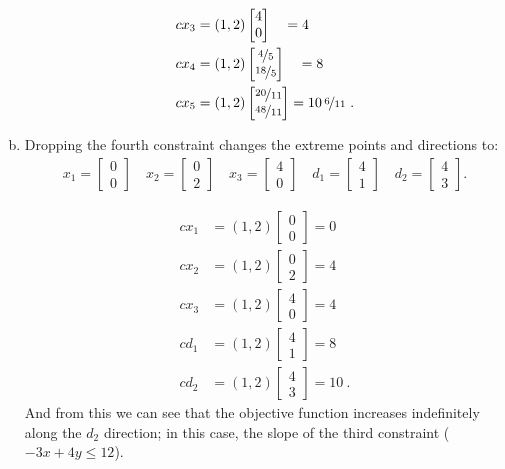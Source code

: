 \documentclass[12pt]{amsart}
\begin{document}
\begin{enumerate}[a.]
\begin{align*}
		cx_3 &= (1,2)\begin{bmatrix} 4 \\ 0 \end{bmatrix} \quad  = 4 \\
		cx_4 &= (1,2)\begin{bmatrix} \nicefrac{4}{5} \\ \nicefrac{18}{5} \end{bmatrix} \quad = 8 \\
		cx_5 &= (1,2)\begin{bmatrix}\nicefrac{20}{11}\\ \nicefrac{48}{11} \end{bmatrix} = 10 \,\nicefrac{6}{11} \ . 
	\end{align*}
	
	\item 
	Dropping the fourth constraint changes the extreme points and directions to:
	\begin{align*}
		x_1 = \begin{bmatrix} 0 \\ 0 \end{bmatrix} \quad
		x_2 = \begin{bmatrix} 0 \\ 2 \end{bmatrix} \quad
		x_3 = \begin{bmatrix} 4 \\ 0 \end{bmatrix} \quad
		d_1 = \begin{bmatrix} 4 \\ 1 \end{bmatrix} \quad
		d_2 = \begin{bmatrix} 4 \\ 3 \end{bmatrix}.
	\end{align*}

	\begin{align*}
		cx_1 &= (1,2)\begin{bmatrix} 0 \\ 0 \end{bmatrix}  = 0 \\
		cx_2 &= (1,2)\begin{bmatrix} 0 \\ 2 \end{bmatrix}  = 4 \\
		cx_3 &= (1,2)\begin{bmatrix} 4 \\ 0 \end{bmatrix}  = 4 \\
		cd_1 &= (1,2)\begin{bmatrix} 4 \\ 1 \end{bmatrix}  = 8 \\
		cd_2 &= (1,2)\begin{bmatrix} 4 \\ 3 \end{bmatrix}  = 10 \ . 
	\end{align*}
	And from this we can see that the objective function increases indefinitely along the \(d_2\) direction;
	in this case, the slope of the third constraint (\(-3x+4y\leq12\)).
	

\end{enumerate}
\end{document}
